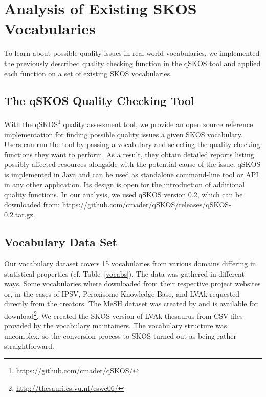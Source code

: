 
\section{Analysis of Existing SKOS Vocabularies}\label{sec:analysis}

To learn about possible quality issues in real-world vocabularies, we implemented the previously described quality checking function in the qSKOS tool and applied each function on a set of existing SKOS vocabularies. 

\subsection{The qSKOS Quality Checking Tool}

With the qSKOS\footnote{\url{https://github.com/cmader/qSKOS/}} quality assessment tool, we provide an open source reference implementation for finding possible quality issues a given SKOS vocabulary. Users can run the tool by passing a vocabulary and selecting the quality checking functions they want to perform. As a result, they obtain detailed reports listing possibly affected resources alongside with the potential cause of the issue. qSKOS is implemented in Java and can be used as standalone command-line tool or API in any other application. Its design is open for the introduction of additional quality functions. In our analysis, we used qSKOS version 0.2, which can be downloaded from: \url{https://github.com/cmader/qSKOS/releases/qSKOS-0.2.tar.gz}.

\subsection{Vocabulary Data Set}

Our vocabulary dataset covers 15 vocabularies from various domains differing in statistical properties (cf. Table~\ref{vocabs}). The data was gathered in different ways. Some vocabularies where downloaded from their respective project websites or, in the cases of IPSV, Peroxisome Knowledge Base, and LVAk requested directly from the creators. The MeSH dataset was created by \cite{Assem2006} and is available for download\footnote{\url{http://thesauri.cs.vu.nl/eswc06/}}. We created the SKOS version of LVAk thesaurus from CSV files provided by the vocabulary maintainers. The vocabulary structure was uncomplex, so the conversion process to SKOS turned out as being rather straightforward.

